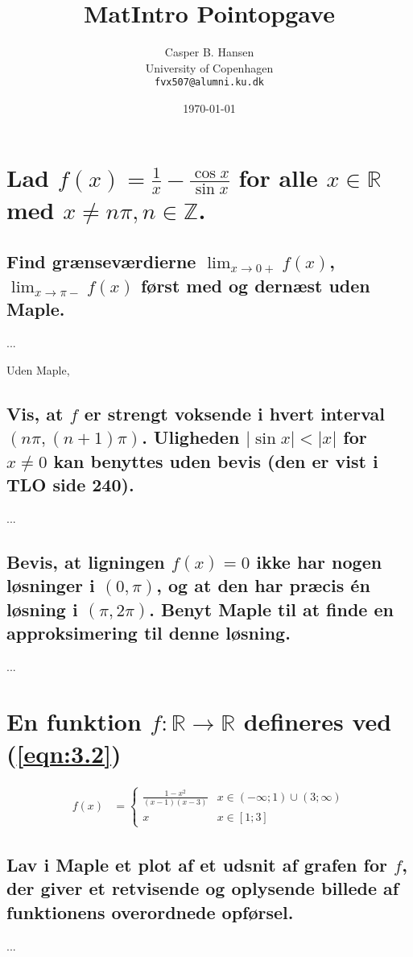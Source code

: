 \documentclass[11pt,a4paper]{article}
\title{MatIntro Pointopgave \assignmentnumber}
\author
{
    Casper B. Hansen\\
    University of Copenhagen\\
    {\tt fvx507@alumni.ku.dk}
}
\date{\today}
\newcommand{\modulus}[1]{\lvert#1\rvert}
\newcommand{\limit}[2]{\lim_{#1 \rightarrow #2}}
\newcommand{\eqnref}[1]{(\ref{eqn:#1})}
\begin{document}


\section
{
    \mdseries
    Lad $f(x) = \frac{1}{x} - \frac{\cos x}{\sin x}$ for alle $x \in
    \mathbb{R}$ med $x \neq n\pi, n \in \mathbb{Z}$.
}

\subsection
{
    \mdseries
    Find grænseværdierne $\limit{x}{0+} f(x)$, $\limit{x}{\pi-} f(x)$ først
    med og dernæst uden Maple.
}
...

Uden Maple,

\subsection
{
    \mdseries
    Vis, at $f$ er strengt voksende i hvert interval $(n\pi,(n+1)\pi)$.
    Uligheden $\modulus{\sin x} < \modulus{x}$ for $x \neq 0$ kan benyttes
    uden bevis (den er vist i TLO side 240).
}
...

\subsection
{
    \mdseries
    Bevis, at ligningen $f(x) = 0$ ikke har nogen løsninger i $(0, \pi)$, og
    at den har præcis én løsning i $(\pi,2\pi)$. Benyt Maple til at finde en
    approksimering til denne løsning.
}
...


\section
{
    \mdseries
    En funktion $f : \mathbb{R} \rightarrow \mathbb{R}$ defineres ved
    \eqnref{3.2}
}
\begin{align}
    f(x) &=
    \begin{cases}
        \frac{1 - x^2}{(x -1)(x - 3)} &x \in (-\infty;1) \cup (3;\infty) \\
        x &x \in [1;3]
    \end{cases}
    \label{eqn:3.2}
\end{align}

\subsection
{
    \mdseries
    Lav i Maple et plot af et udsnit af grafen for $f$, der giver et
    retvisende og oplysende billede af funktionens overordnede opførsel.
}
...
\end{document}
